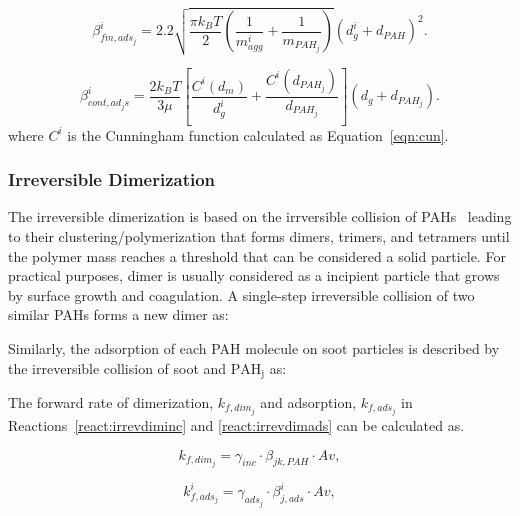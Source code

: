 \begin{equation}
	\beta^i_{fm, ads_j}=
	2.2 
	\sqrt{
		\frac{\pi k_B T}{2}\left(\frac{1}{m^i_{agg}}+\frac{1}{m_{PAH_j}}\right)
	}
	\left(d^i_g+d_{PAH}\right)^2.
	\label{eqn:betafmads}
\end{equation}

\begin{equation}
	\beta^i_{cont, ad_js}=
	\frac{2 k_B T}{3 \mu}
	\left[
	\frac{C^i\left(d_m\right)}{d^i_g}+
	\frac{C^i\left(d_{PAH_j}\right)}{d_{PAH_j}}
	\right]
	\left(d_g+d_{PAH_j}\right).
	\label{eqn:betacontads}
\end{equation}
 \noindent where $C^i$ is the Cunningham function calculated as Equation~\eqref{eqn:cun}.
\subsubsection{Irreversible Dimerization}

The irreversible dimerization is based on the irrversible collision of PAHs~\citep{appel2000kinetic} leading to their clustering/polymerization that forms dimers, trimers, and tetramers until the polymer mass reaches a threshold that can be considered a solid particle. For practical purposes, dimer is usually considered as a incipient particle that grows by surface growth and coagulation. A single-step irreversible collision of two similar PAHs forms a new dimer as:


Similarly, the adsorption of each PAH molecule on soot particles is described by the irreversible collision of soot and $\mathrm{PAH_j}$ as:

The forward rate of dimerization, ${k_{f,dim_j}}$ and adsorption, $k_{f,ads_j}$ in Reactions~\eqref{react:irrevdiminc} and \eqref{react:irrevdimads} can be calculated as.

\begin{equation}
	k_{f,dim_j}=
	\gamma_{inc}\cdot\beta_{jk,PAH}\cdot Av
	\label{eqn:kfdim},
\end{equation}

\begin{equation}
	k^i_{f,ads_j}=
	\gamma_{ads_j}\cdot\beta^i_{j,ads}\cdot Av
	\label{eqn:kfads},
\end{equation}

